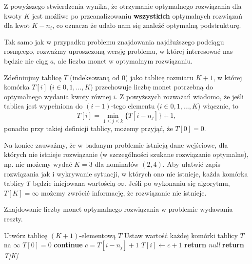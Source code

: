 Z powyższego stwierdzenia wynika, że otrzymanie optymalnego 
rozwiązania dla kwoty $K$ jest możliwe po przeanalizowaniu 
\textbf{wszystkich} optymalnych rozwiązań dla kwot $K - n_i$,
co oznacza że udało nam się znaleźć optymalną podstrukturę.

Tak samo jak w przypadku problemu znajdowania najdłuższego 
podciągu rosnącego, rozważmy uproszczoną wersję problemu, 
w której interesować nas będzie nie ciąg $a$, ale 
liczba monet w optymalnym rozwiązaniu. 

Zdefiniujmy tablicę $T$ (indeksowaną od $0$) jako 
tablicę rozmiaru $K + 1$, w której komórka $T[i]$ ($i \in {0, 1, \ldots, K}$)
przechowuje liczbę monet potrzebną do optymalnego wydania kwoty równej $i$.
Z powyższych rozważań
wiadomo, że jeśli tablica jest wypełniona do $(i-1)$-tego
elementu ($i \in {0, 1, \ldots, K}$) włącznie, to 
\begin{equation}
	T[i] = \min_{1 \leq j \leq k}\{T[i - n_j]\} + 1,
	\label{eq:min_change_making_relation}
\end{equation}
ponadto przy takiej definicji tablicy, możemy przyjąć, że $T[0] = 0$.

Na koniec zauważmy, że w badanym problemie
istnieją dane wejściowe, dla których nie 
istnieje rozwiązanie (w szczególności szukane rozwiązanie optymalne),
np. nie możemy wydać $K=3$ dla nominałów $(2, 4)$. 
Aby ułatwić zapis rozwiązania jak i wykrywanie sytuacji, w których
ono nie istnieje, każda komórka tablicy $T$ będzie inicjowana
wartością $\infty$. Jeśli po wykonaniu się algorytmu, $T[K] = \infty$
możemy zwrócić informację, że rozwiązanie nie istnieje.

\begin{algorithm}[H]
	\caption{Znajdowanie liczby monet optymalnego 
		rozwiązania w problemie wydawania reszty.}\label{MinCoinsCountChangeMaking}
	\begin{algorithmic}[1]
		\State Utwórz tablicę $(K+1)$-elementową $T$
		\State Ustaw wartość każdej komórki tablicy $T$ na $\infty$
		\State $T[0] = 0$
		 \textbf{continue}
		\EndIf
		\State $c = T[i - n_j] + 1$
		 $T[i] \gets c + 1$
		\EndIf
		\EndFor
		\EndFor
		 \textbf{return} \textit{null}
		\EndIf
		\State \textbf{return} \textit{T[K]}
		\EndProcedure
	\end{algorithmic}
\end{algorithm}

